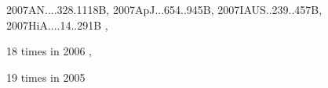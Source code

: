 \documentclass[12pt]{article}
\begin{document}
\begin{description}
{2007AN....328.1118B,%
2007ApJ...654..945B,%
2007IAUS..239..457B,%
2007HiA....14..291B%
},\item
18 times in 2006 \citep{
2006ApJ...653..558O,%
2006A&A...459..935H,%
2006A&A...457..371F,%
2006MNRAS.370..529D,%
2006PhFl...18g5106H,%
2006ApJ...643.1219J,%
2006ApJ...636.1121J,%
2006MNRAS.370L..71J,%
2006A&A...448L..33S,%
2006MNRAS.370..415M,%
2006MNRAS.373..643S,%
2006A&A...450..437B,%
2006A&A...454..815G,%
2006A&A...448..731H,%
2006ApJ...638..336D,%
2006ASPC..354..121B,%
2006AN....327..461B,%
2006IAUJD...8E..62B%
},\item
19 times in 2005 \citep{
2005ApJ...634.1353J,%
}
\end{description}
\end{document}
